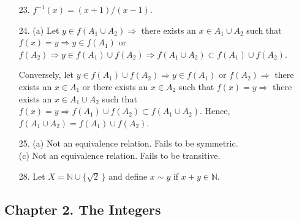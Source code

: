 {\begin{itemize}
\item[23.]
$f^{-1}(x) = (x+1)/(x-1)$.
 
\item[24.]
(a)  Let $y \in f(A_1 \cup A_2) \Rightarrow$ there exists an $x
\in A_1 \cup A_2$ such that $f(x) = y \Rightarrow y \in f(A_1)$ or
$f(A_2) \Rightarrow y \in f(A_1) \cup f(A_2) \Rightarrow f(A_1 \cup A_2)
\subset f(A_1) \cup f(A_2)$.
 
Conversely, let $y \in f(A_1) \cup f(A_2) \Rightarrow y \in f(A_1)$ or
$f(A_2) \Rightarrow$ there exists an $x \in A_1$ or there exists an
$x \in A_2$ such that $f(x) = y \Rightarrow$ there exists an $x \in
A_1 \cup A_2$ such that $f(x) = y \Rightarrow f(A_1) \cup f(A_2)
\subset f(A_1 \cup A_2)$. Hence, $f(A_1 \cup A_2) = f(A_1) \cup f(A_2)$. 
 
\item[25.]
(a) Not an equivalence relation. Fails to be symmetric.\\
(c) Not an equivalence relation. Fails to be transitive.
 
\item[28.]
Let $X = {\mathbb N} \cup \{ \sqrt{2}\, \}$ and define $x \sim y$ if $x + y
\in {\mathbb N}$.
 
\end{itemize}
}
 
 
 
\subsection*{Chapter 2. The Integers}
 
